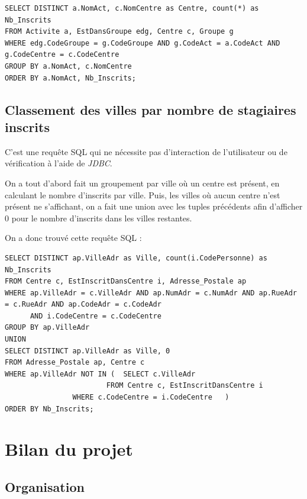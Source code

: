 \documentclass[10pt]{article}
\begin{document}
\begin{small}
\begin{verbatim}
SELECT DISTINCT a.NomAct, c.NomCentre as Centre, count(*) as Nb_Inscrits
FROM Activite a, EstDansGroupe edg, Centre c, Groupe g
WHERE edg.CodeGroupe = g.CodeGroupe AND g.CodeAct = a.CodeAct AND g.CodeCentre = c.CodeCentre
GROUP BY a.NomAct, c.NomCentre
ORDER BY a.NomAct, Nb_Inscrits;
\end{verbatim}
\end{small}

\subsection{Classement des villes par nombre de stagiaires inscrits}

C'est une requête SQL qui ne nécessite pas d'interaction de l'utilisateur ou de vérification à l'aide de \emph{JDBC}. 

On a tout d'abord fait un groupement par ville où un centre est présent, en calculant le nombre d'inscrits par ville.
Puis, les villes où aucun centre n'est présent ne s'affichant, on a fait une union avec les tuples précédents afin d'afficher $0$ 
pour le nombre d'inscrits dans les villes restantes.

On a donc trouvé cette requête SQL :

\begin{small}
\begin{verbatim}
SELECT DISTINCT ap.VilleAdr as Ville, count(i.CodePersonne) as Nb_Inscrits
FROM Centre c, EstInscritDansCentre i, Adresse_Postale ap
WHERE ap.VilleAdr = c.VilleAdr AND ap.NumAdr = c.NumAdr AND ap.RueAdr = c.RueAdr AND ap.CodeAdr = c.CodeAdr 
      AND i.CodeCentre = c.CodeCentre
GROUP BY ap.VilleAdr
UNION
SELECT DISTINCT ap.VilleAdr as Ville, 0
FROM Adresse_Postale ap, Centre c
WHERE ap.VilleAdr NOT IN (	SELECT c.VilleAdr
      		      	 	FROM Centre c, EstInscritDansCentre i
				WHERE c.CodeCentre = i.CodeCentre	)
ORDER BY Nb_Inscrits;
\end{verbatim}
\end{small}

\section{Bilan du projet}

\subsection{Organisation}
\end{document}
